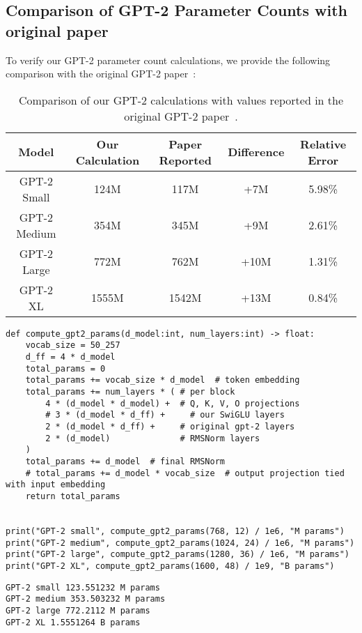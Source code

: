 \subsection{Comparison of GPT-2 Parameter Counts with original paper}
\label{appendix:gpt2-param-comparison}

To verify our GPT-2 parameter count calculations, we provide the following comparison with the original GPT-2 paper~\cite{radford2019language}:

\begin{table}[h]
    \centering
    \caption{Comparison of our GPT-2 calculations with values reported in the original GPT-2 paper~\cite{radford2019language}.}
    \label{tab:gpt2-param-comparison}
    \begin{tabular}{c|c|c|c|c}
        \toprule
        Model & Our Calculation & Paper Reported & Difference & Relative Error \\
        \midrule
        GPT-2 Small & 124M & 117M & +7M & 5.98\% \\
        GPT-2 Medium & 354M & 345M & +9M & 2.61\% \\
        GPT-2 Large & 772M & 762M & +10M & 1.31\% \\
        GPT-2 XL & 1555M & 1542M & +13M & 0.84\% \\
        \bottomrule
    \end{tabular}
\end{table}

\begin{lstlisting}
def compute_gpt2_params(d_model:int, num_layers:int) -> float:
    vocab_size = 50_257
    d_ff = 4 * d_model
    total_params = 0
    total_params += vocab_size * d_model  # token embedding
    total_params += num_layers * ( # per block
        4 * (d_model * d_model) +  # Q, K, V, O projections
        # 3 * (d_model * d_ff) +     # our SwiGLU layers
        2 * (d_model * d_ff) +     # original gpt-2 layers
        2 * (d_model)              # RMSNorm layers
    )
    total_params += d_model  # final RMSNorm
    # total_params += d_model * vocab_size  # output projection tied with input embedding
    return total_params


print("GPT-2 small", compute_gpt2_params(768, 12) / 1e6, "M params")
print("GPT-2 medium", compute_gpt2_params(1024, 24) / 1e6, "M params")
print("GPT-2 large", compute_gpt2_params(1280, 36) / 1e6, "M params")
print("GPT-2 XL", compute_gpt2_params(1600, 48) / 1e9, "B params")
\end{lstlisting}

\begin{lstlisting}
GPT-2 small 123.551232 M params
GPT-2 medium 353.503232 M params
GPT-2 large 772.2112 M params
GPT-2 XL 1.5551264 B params
\end{lstlisting}